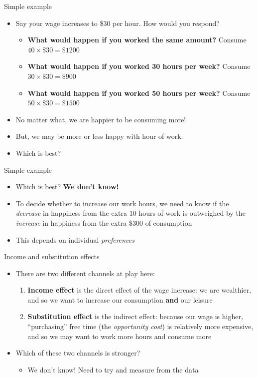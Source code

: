\documentclass[aspectratio=169]{beamer}
\begin{document}
\begin{frame}{Simple example}
    \begin{itemize}
        \item Say your wage increases to \$30 per hour. How would you respond?
        \begin{itemize}
            \item \textbf{What would happen if you worked the same amount?} Consume $40 \times \$30 = \$1200 $
            \item \textbf{What would happen if you worked 30 hours per week?} Consume $30 \times \$30 = \$900 $
            \item \textbf{What would happen if you worked 50 hours per week?} Consume $50 \times \$30 = \$1500 $
        \end{itemize}
        \item No matter what, we are happier to be consuming more!
        \item But, we may be more or less happy with hour of work.
        \item Which is best?
    \end{itemize}
\end{frame}

\begin{frame}{Simple example}
    \begin{itemize}
        \item Which is best? \textbf{We don't know!}
        \item To decide whether to increase our work hours, we need to know if the \textit{decrease} in happiness from the extra 10 hours of work is outweighed by the \textit{increase} in happiness from the extra \$300 of consumption
        \item This depends on individual \textit{preferences}
    \end{itemize}
\end{frame}

\begin{frame}{Income and substitution effects}
    \begin{itemize}
        \item There are two different channels at play here:
        \begin{enumerate}
            \item \textbf{Income effect} is the direct effect of the wage increase: we are wealthier, and so we want to increase our consumption \textbf{and} our leisure
            \item \textbf{Substitution effect} is the indirect effect: because our wage is higher, ``purchasing'' free time (the \textit{opportunity cost}) is relatively more expensive, and so we may want to work more hours and consume more 
        \end{enumerate}
        \item Which of these two channels is stronger?
        \begin{itemize}
            \item We don't know! Need to try and measure from the data
        \end{itemize}
    \end{itemize}
\end{frame}
\end{document}
